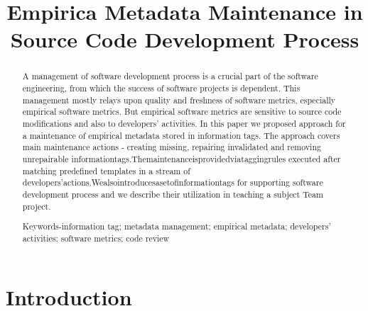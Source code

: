 \documentclass[18px,a4, conference]{IEEEtran}
\begin{document}
\title {{ Empirica Metadata Maintenance in Source Code Development Process}}
\author{
\and
{}
}



\maketitle


\begin{abstract}
A management of software development process is a crucial part of the software engineering, from which the success of software projects is dependent. This management mostly relays upon quality and freshness of software metrics, especially empirical software metrics. But empirical software metrics are sensitive to source code modiﬁcations and also to developers’ activities. In this paper we proposed approach for a maintenance of empirical metadata stored in information tags. The approach covers main maintenance actions - creating missing, repairing invalidated and removing unrepairable informationtags.Themaintenanceisprovidedviataggingrules executed after matching predeﬁned templates in a stream of developers’actions.Wealsointroducesasetofinformationtags for supporting software development process and we describe their utilization in teaching a subject Team project.

 Keywords-information tag; metadata management; empirical metadata; developers’ activities; software metrics; code review
\end{abstract}

\IEEEpeerreviewmaketitle
 
 


\section{Introduction}					%
\label{sec:Introduction}
\end{document}
